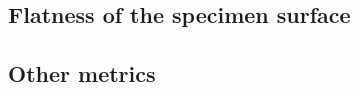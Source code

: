 \subsection{Flatness of the specimen surface}
\label{discussion:other:flatness}

\subsection{Other metrics}
\label{discussion:other:other_metrics}






























